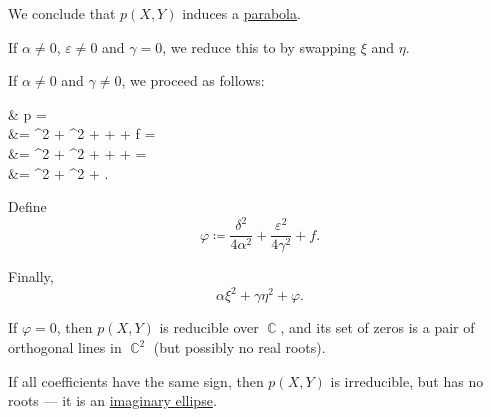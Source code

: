 \begin{algorithm}
\begin{thmenum}
    We conclude that \( p(X, Y) \) induces a \hyperref[def:parabola]{parabola}.

     If \( \alpha \neq 0 \), \( \varepsilon \neq 0 \) and \( \gamma = 0 \), we reduce this to  by swapping \( \xi \) and \( \eta \).

     If \( \alpha \neq 0 \) and \( \gamma \neq 0 \), we proceed as follows:
    \begin{balign*}
      &\phantom{{}={}}
      p\parens*{ \xi - \frac \delta {2 \alpha}, \eta - \frac \varepsilon {2 \gamma} }
      = \\ &=
      \alpha \parens*{ \xi - \frac \delta {2 \alpha} }^2 + \gamma \parens*{ \eta - \frac \varepsilon {2 \gamma} }^2 + \delta \parens*{ \xi - \frac \delta {2 \alpha} } + \varepsilon \parens*{ \eta - \frac \varepsilon {2 \gamma} } + f
      = \\ &=
      \alpha \xi^2 + \gamma \eta^2 + \parens[\Big]{ 2 \alpha \cdot \frac {-\delta} {2 \alpha} + \delta } \xi + \parens[\Big]{ 2 \gamma \cdot \frac {-\varepsilon} {2 \gamma} + \varepsilon } \eta + 
      = \\ &=
      \alpha \xi^2 + \gamma \eta^2 + .
    \end{balign*}

    Define
    \begin{equation*}
      \varphi \coloneqq \frac {\delta^2} {4 \alpha^2} + \frac {\varepsilon^2} {4 \gamma^2} + f.
    \end{equation*}

    Finally,
    \begin{equation*}
      \alpha \xi^2 + \gamma \eta^2 + \varphi.
    \end{equation*}

    \begin{thmenum}
       If \( \varphi = 0 \), then \( p(X, Y) \) is reducible over \( \BbbC \), and its set of zeros is a pair of orthogonal lines in \( \BbbC^2 \) (but possibly no real roots).

       If all coefficients have the same sign, then \( p(X, Y) \) is irreducible, but has no roots --- it is an \hyperref[ex:imaginary_ellipse]{imaginary ellipse}.


\end{thmenum}
\end{thmenum}
\end{algorithm}
